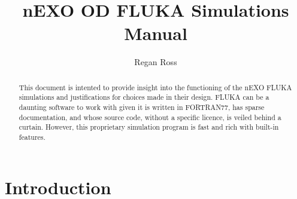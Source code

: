 \documentclass[10pt]{article}
\title{nEXO OD FLUKA Simulations Manual}
\author{Regan Ross}
\begin{document}
\begin{titlepage}
    \maketitle
    \vspace{4cm}
    \centering
\end{titlepage}

\begin{abstract}
    This document is intented to provide insight into the functioning of the nEXO FLUKA simulations and justifications for choices made in their design. FLUKA can be a daunting software to work with given it is written in FORTRAN77, has sparse documentation, and whose source code, without a specific licence, is veiled behind a curtain. However, this proprietary simulation program is fast and rich with built-in features.
\end{abstract}


\vspace{1.5cm}
\listoffigures

\newpage
\tableofcontents

\break
\part{Introduction}

    






% 
% 
\end{document}
